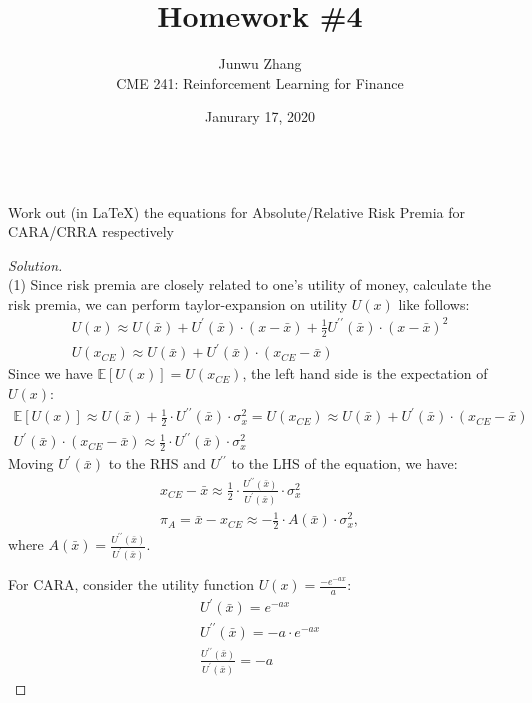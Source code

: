 \documentclass[12pt]{article}
\date{Janurary 17, 2020}
\newenvironment{problem}[2][Problem]{\begin{trivlist}
\item[\hskip \labelsep {\bfseries #1}\hskip \labelsep {\bfseries #2.}]}{\end{trivlist}}
\newenvironment{solution}
  {\renewcommand\qedsymbol{$\blacksquare$}\begin{proof}[Solution]}
  {\end{proof}}
\begin{document}
 
\title{Homework \#4}
\author{Junwu Zhang\\ 
CME 241: Reinforcement Learning for Finance}
 
\maketitle

\begin{problem}{1}
\text{ }\\
Work out (in \LaTeX) the equations for Absolute/Relative Risk Premia for CARA/CRRA respectively
\end{problem}
\begin{solution}
\text{ }\\
(1) Since risk premia are closely related to one's utility of money, calculate the risk premia, we can perform taylor-expansion on utility $U(x)$ like follows:
\begin{gather}
	U(x) \approx U(\bar{x}) + U^{\prime}(\bar{x}) \cdot (x-\bar{x}) + \frac{1}{2}U^{\prime\prime}(\bar{x})\cdot (x-\bar{x})^2 \\
	U(x_{CE}) \approx U(\bar{x}) + U^{\prime}(\bar{x}) \cdot (x_{CE} - \bar{x})
\end{gather}
Since we have $\mathbb{E}[U(x)] = U(x_{CE})$, the left hand side is the expectation of $U(x)$:
\begin{gather}
	\mathbb{E}[U(x)] \approx U(\bar{x}) + \frac{1}{2} \cdot U^{\prime\prime}(\bar{x})\cdot \sigma_x^2 = U(x_{CE}) \approx U(\bar{x}) + U^{\prime}(\bar{x}) \cdot (x_{CE} - \bar{x}) \\
	U^{\prime}(\bar{x}) \cdot (x_{CE} - \bar{x}) \approx \frac{1}{2} \cdot U^{\prime\prime}(\bar{x})\cdot \sigma_x^2
\end{gather}
Moving $U^{\prime}(\bar{x})$ to the \gls*{RHS} and $U^{\prime\prime}$ to the \gls*{LHS} of the equation, we have:
\begin{gather}
x_{CE} - \bar{x} \approx \frac{1}{2} \cdot \frac{U^{\prime\prime}(\bar{x})}{U^{\prime}(\bar{x})}\cdot \sigma_x^2 \\
\pi_A = \bar{x} - x_{CE} \approx -\frac{1}{2} \cdot A(\bar{x}) \cdot \sigma_x^2,
\end{gather}
where $A(\bar{x}) = \frac{U^{\prime\prime}(\bar{x})}{U^{\prime}(\bar{x})}$.

For \gls{CARA}, consider the utility function $U(x) = \frac{-e^{-ax}}{a}$:
\begin{gather}
	U^{\prime}(\bar{x}) = e^{-ax} \\
	U^{\prime\prime}(\bar{x}) = -a\cdot e^{-ax} \\
	\frac{U^{\prime\prime}(\bar{x})}{U^{\prime}(\bar{x})} = -a
\end{gather}


\end{solution}
\end{document}
